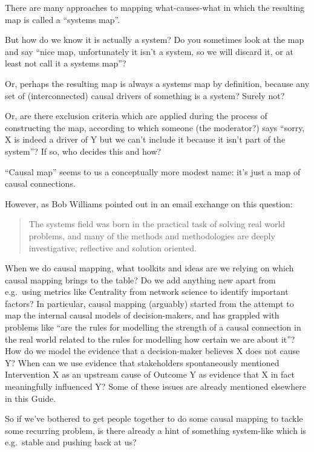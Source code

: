 \documentclass[
]{book}
\begin{document}
There are many approaches to mapping what-causes-what in which the resulting map is called a ``systems map''.

But how do we know it is actually a system? Do you sometimes look at the map and say ``nice map, unfortunately it isn't a system, so we will discard it, or at least not call it a systems map''?

Or, perhaps the resulting map is always a systems map by definition, because any set of (interconnected) causal drivers of something is a system? Surely not?

Or, are there exclusion criteria which are applied during the process of constructing the map, according to which someone (the moderator?) says ``sorry, X is indeed a driver of Y but we can't include it because it isn't part of the system''? If so, who decides this and how?

``Causal map'' seems to us a conceptually more modest name: it's just a map of causal connections.

However, as Bob Williams pointed out in an email exchange on this question:

\begin{quote}
The systems field was born in the practical task of solving real world problems, and many of the methods and methodologies are deeply investigative, reflective and solution oriented.
\end{quote}

When we do causal mapping, what toolkits and ideas are we relying on which causal mapping brings to the table? Do we add anything new apart from e.g.~using metrics like Centrality from network science to identify important factors? In particular, causal mapping (arguably) started from the attempt to map the internal causal models of decision-makers, and has grappled with problems like ``are the rules for modelling the strength of a causal connection in the real world related to the rules for modelling how certain we are about it''? How do we model the evidence that a decision-maker believes X does not cause Y? When can we use evidence that stakeholders spontaneously mentioned Intervention X as an upstream cause of Outcome Y as evidence that X in fact meaningfully influenced Y? Some of these issues are already mentioned elsewhere in this Guide.

So if we've bothered to get people together to do some causal mapping to tackle some recurring problem, is there already a hint of something system-like which is e.g.~stable and pushing back at us?
\end{document}
